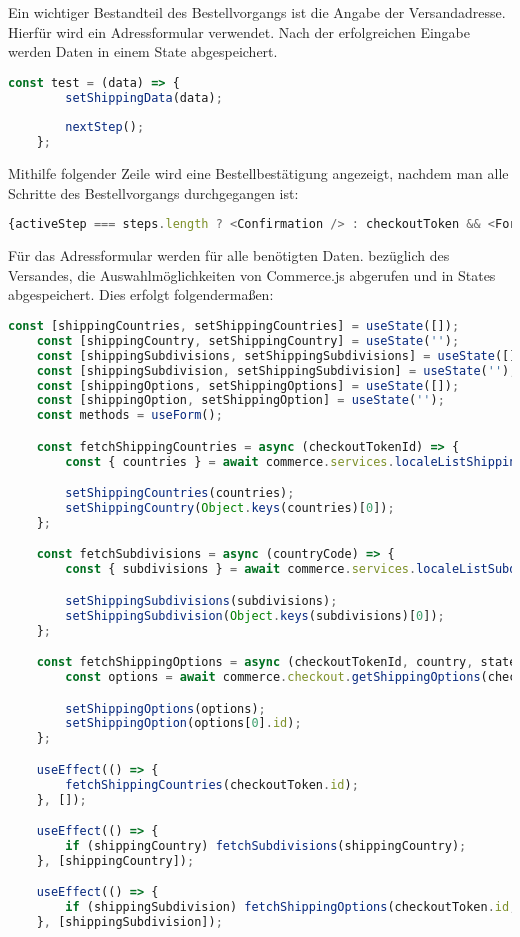 Ein wichtiger Bestandteil des Bestellvorgangs ist die Angabe der Versandadresse. Hierfür wird ein Adressformular verwendet. Nach der erfolgreichen Eingabe werden Daten in einem State abgespeichert.

\begin{lstlisting}[language=JavaScript]
    const test = (data) => {
        setShippingData(data);
    
        nextStep();
    };
\end{lstlisting}

Mithilfe folgender Zeile wird eine Bestellbestätigung angezeigt, nachdem man alle Schritte des Bestellvorgangs durchgegangen ist:

\begin{lstlisting}[language=JavaScript]
    {activeStep === steps.length ? <Confirmation /> : checkoutToken && <Form />}
\end{lstlisting}

Für das Adressformular werden für alle benötigten Daten. bezüglich des Versandes, die Auswahlmöglichkeiten von Commerce.js abgerufen und in States abgespeichert. Dies erfolgt folgendermaßen:

\begin{lstlisting}[language=JavaScript]
    const [shippingCountries, setShippingCountries] = useState([]);
    const [shippingCountry, setShippingCountry] = useState('');
    const [shippingSubdivisions, setShippingSubdivisions] = useState([]);
    const [shippingSubdivision, setShippingSubdivision] = useState('');
    const [shippingOptions, setShippingOptions] = useState([]);
    const [shippingOption, setShippingOption] = useState('');
    const methods = useForm();

    const fetchShippingCountries = async (checkoutTokenId) => {
        const { countries } = await commerce.services.localeListShippingCountries(checkoutTokenId);

        setShippingCountries(countries);
        setShippingCountry(Object.keys(countries)[0]);
    };

    const fetchSubdivisions = async (countryCode) => {
        const { subdivisions } = await commerce.services.localeListSubdivisions(countryCode);

        setShippingSubdivisions(subdivisions);
        setShippingSubdivision(Object.keys(subdivisions)[0]);
    };

    const fetchShippingOptions = async (checkoutTokenId, country, stateProvince = null) => {
        const options = await commerce.checkout.getShippingOptions(checkoutTokenId, { country, region: stateProvince });

        setShippingOptions(options);
        setShippingOption(options[0].id);
    };

    useEffect(() => {
        fetchShippingCountries(checkoutToken.id);
    }, []);

    useEffect(() => {
        if (shippingCountry) fetchSubdivisions(shippingCountry);
    }, [shippingCountry]);

    useEffect(() => {
        if (shippingSubdivision) fetchShippingOptions(checkoutToken.id, shippingCountry, shippingSubdivision);
    }, [shippingSubdivision]);
\end{lstlisting}


